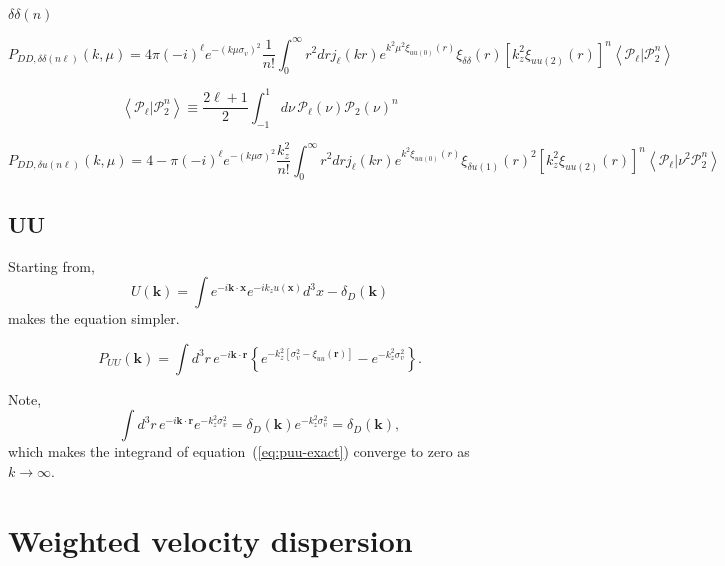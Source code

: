 \documentclass[a4paper,11pt, fleqn]{article}
\begin{document}
$\delta\delta(n)$

\begin{equation}
  P_{DD, \delta\delta (n\ell)}(k, \mu) =
  4\pi (-i)^\ell e^{-(k\mu\sigma_v)^2}
  \frac{1}{n!} \int_0^\infty \! r^2 dr j_\ell(kr) e^{k^2\mu^2 \xi_{uu(0)}(r)}
  \xi_{\delta\delta}(r)
  \left[ k_z^2 \xi_{uu(2)}(r) \right]^n
  \left\langle \mathcal{P}_\ell | \mathcal{P}_2^n \right\rangle
\end{equation}

\begin{equation}
  \left\langle \mathcal{P}_\ell | \mathcal{P}_2^n \right\rangle
  \equiv
  \frac{2\ell + 1}{2} \int_{-1}^1 \!d\nu \,
  \mathcal{P}_\ell(\nu) \mathcal{P}_2(\nu)^n
\end{equation}

\begin{equation}
  P_{DD, \delta u (n\ell)}(k, \mu) =
  4-\pi (-i)^\ell e^{-(k\mu\sigma)^2}
  \frac{k_z^2}{n!} \int_0^\infty \! r^2 dr j_\ell(kr) e^{k^2 \xi_{uu(0)}(r)}
  \xi_{\delta u (1)}(r)^2
  \left[ k_z^2 \xi_{uu(2)}(r) \right]^n
  \left\langle \mathcal{P}_\ell | \nu^2 \mathcal{P}_2^n\right\rangle
\end{equation}

\clearpage
\subsection{UU}

Starting from,
%
\begin{equation}
  U(\bm{k}) = \int \! e^{-i\bm{k}\cdot\bm{x}} e^{-ik_zu(\bm{x})} d^3 x
  - \delta_D(\bm{k})
\end{equation}
%
makes the equation simpler.

\begin{equation}
  \label{eq:puu-exact}
  P_{UU}(\bm{k}) = \int\!\! d^3 r \, e^{-i\bm{k}\cdot\bm{r}}\left\{
  e^{-k_z^2 \left[ \sigma_v^2 - \xi_{uu}(\bm{r}) \right]} - e^{-k_z^2 \sigma_v^2}
  \right\}.
\end{equation}

Note,
%
\begin{equation}
  \int\! d^3 r \, e^{-i\bm{k}\cdot\bm{r}} e^{-k_z^2 \sigma_v^2}
  = \delta_D(\bm{k}) e^{-k_z^2 \sigma_v^2} = \delta_D(\bm{k}),
\end{equation}
%
which makes the integrand of equation~(\ref{eq:puu-exact}) converge to
zero as $k \rightarrow \infty$.


%
%
\clearpage
\section{Weighted velocity dispersion}
\end{document}
